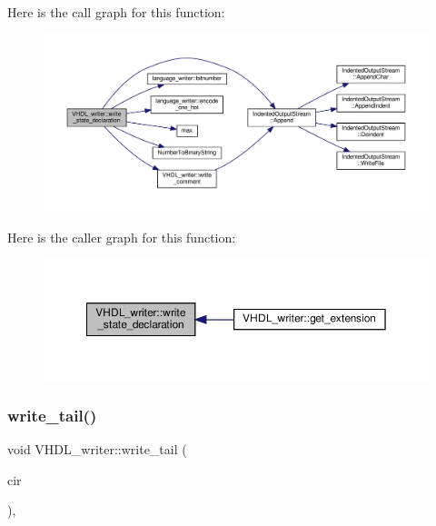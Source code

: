 Here is the call graph for this function\+:
\nopagebreak
\begin{figure}[H]
\begin{center}
\leavevmode
\includegraphics[width=350pt]{d0/d0c/structVHDL__writer_a0c98259dd9ea0a8ac551a7204e3a734f_cgraph}
\end{center}
\end{figure}
Here is the caller graph for this function\+:
\nopagebreak
\begin{figure}[H]
\begin{center}
\leavevmode
\includegraphics[width=350pt]{d0/d0c/structVHDL__writer_a0c98259dd9ea0a8ac551a7204e3a734f_icgraph}
\end{center}
\end{figure}
\mbox{\label{structVHDL__writer_aaba770cf999a1be1ead3e65623adc02f}} 
\subsubsection{\texorpdfstring{write\+\_\+tail()}{write\_tail()}}
{\footnotesize\ttfamily void V\+H\+D\+L\+\_\+writer\+::write\+\_\+tail (\begin{DoxyParamCaption}\item[{const \hyperlink{structural__objects_8hpp_a8ea5f8cc50ab8f4c31e2751074ff60b2}{structural\+\_\+object\+Ref} \&}]{cir }\end{DoxyParamCaption})\hspace{0.3cm}{\ttfamily [override]}, {\ttfamily [virtual]}}



